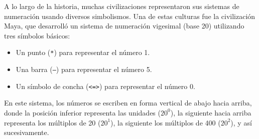 
A lo largo de la historia, muchas civilizaciones representaron sus sistemas de numeraci\'on usando diversos simbolismos. Una de estas culturas fue la civilización Maya, que desarrolló un sistema de numeración vigesimal (base 20) utilizando tres símbolos básicos:

\begin{itemize}
    \item Un punto (\texttt{*}) para representar el número 1.
    \item Una barra (\texttt{---}) para representar el número 5.
    \item Un símbolo de concha (\texttt{<=>}) para representar el número 0.
\end{itemize}

En este sistema, los números se escriben en forma vertical de abajo hacia arriba, donde la posición inferior representa las unidades ($20^0$), la siguiente hacia arriba representa los múltiplos de 20 ($20^1$), la siguiente los múltiplos de 400 ($20^2$), y así sucesivamente.

